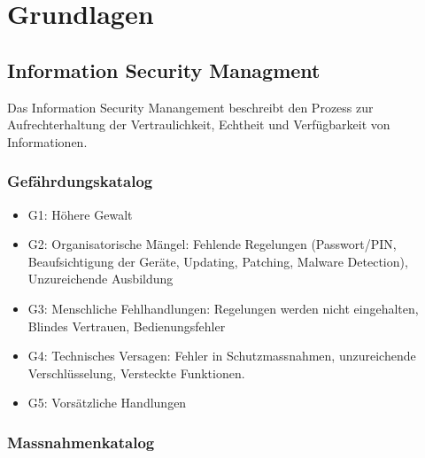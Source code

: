 


\newcommand{\SUBJECT}{Zusammenfassung}
\newcommand{\TITLE}{Informationssicherheit 3}




\section{Grundlagen}

\subsection{Information Security Managment}

Das Information Security Manangement beschreibt den Prozess zur Aufrechterhaltung der Vertraulichkeit, Echtheit und Verfügbarkeit von Informationen.

\subsubsection{Gefährdungskatalog}

\begin{itemize}
	\item G1: Höhere Gewalt
	\item G2: Organisatorische Mängel: Fehlende Regelungen (Passwort/PIN, Beaufsichtigung der Geräte, Updating, Patching, Malware Detection), Unzureichende Ausbildung
	\item G3: Menschliche Fehlhandlungen: Regelungen werden nicht eingehalten, Blindes Vertrauen, Bedienungsfehler
	\item G4: Technisches Versagen: Fehler in Schutzmassnahmen, unzureichende Verschlüsselung, Versteckte Funktionen.
	\item G5: Vorsätzliche Handlungen
\end{itemize}

\subsubsection{Massnahmenkatalog}

